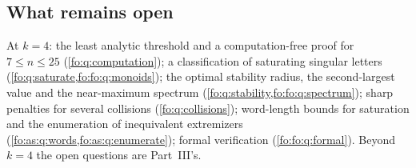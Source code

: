 \documentclass[11pt,a4paper]{article}
\numberwithin{equation}{section}
\theoremstyle{definition}
\theoremstyle{remark}
\begin{document}
\subsection{What remains open}

At $k=4$: the least analytic threshold and a computation-free proof for
$7\le n\le25$ (\cref{fo:q:computation}); a classification of saturating
singular letters (\cref{fo:q:saturate,fo:fo:q:monoids}); the optimal stability
radius, the second-largest value and the near-maximum spectrum
(\cref{fo:q:stability,fo:fo:q:spectrum}); sharp penalties for several
collisions (\cref{fo:q:collisions}); word-length bounds for saturation and the
enumeration of inequivalent extremizers (\cref{fo:as:q:words,fo:as:q:enumerate});
formal verification (\cref{fo:fo:q:formal}). Beyond $k=4$ the open questions
are Part~III's.
\end{document}
